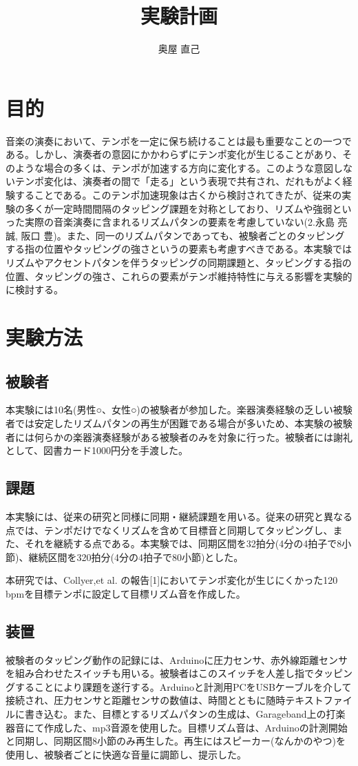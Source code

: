 \documentclass[twocolumn,10pt]{jarticle}
\title{実験計画}
\author{奥屋 直己}
\begin{document}
\maketitle

\section{目的}
音楽の演奏において、テンポを一定に保ち続けることは最も重要なことの一つである。しかし、演奏者の意図にかかわらずにテンポ変化が生じることがあり、そのような場合の多くは、テンポが加速する方向に変化する。このような意図しないテンポ変化は、演奏者の間で「走る」という表現で共有され、だれもがよく経験することである。このテンポ加速現象は古くから検討されてきたが、従来の実験の多くが一定時間間隔のタッピング課題を対称としており、リズムや強弱といった実際の音楽演奏に含まれるリズムパタンの要素を考慮していない(2.永島 亮誠, 阪口 豊)。また、同一のリズムパタンであっても、被験者ごとのタッピングする指の位置やタッピングの強さというの要素も考慮すべきである。本実験ではリズムやアクセントパタンを伴うタッピングの同期課題と、タッピングする指の位置、タッピングの強さ、これらの要素がテンポ維持特性に与える影響を実験的に検討する。

\section{実験方法}
\subsection{被験者}
本実験には10名(男性○、女性○)の被験者が参加した。楽器演奏経験の乏しい被験者では安定したリズムパタンの再生が困難である場合が多いため、本実験の被験者には何らかの楽器演奏経験がある被験者のみを対象に行った。被験者には謝礼として、図書カード1000円分を手渡した。

\subsection{課題}
本実験には、従来の研究と同様に同期・継続課題を用いる。従来の研究と異なる点では、テンポだけでなくリズムを含めて目標音と同期してタッピングし、また、それを継続する点である。本実験では、同期区間を32拍分(4分の4拍子で8小節)、継続区間を320拍分(4分の4拍子で80小節)とした。

本研究では、Collyer,et al. の報告[1]においてテンポ変化が生じにくかった120 bpmを目標テンポに設定して目標リズム音を作成した。

\subsection{装置}
被験者のタッピング動作の記録には、Arduinoに圧力センサ、赤外線距離センサを組み合わせたスイッチも用いる。被験者はこのスイッチを人差し指でタッピングすることにより課題を遂行する。Arduinoと計測用PCをUSBケーブルを介して接続され、圧力センサと距離センサの数値は、時間とともに随時テキストファイルに書き込む。また、目標とするリズムパタンの生成は、Garageband上の打楽器音にて作成した、mp3音源を使用した。目標リズム音は、Arduinoの計測開始と同期し、同期区間8小節のみ再生した。再生にはスピーカー(なんかのやつ)を使用し、被験者ごとに快適な音量に調節し、提示した。
\end{document}
